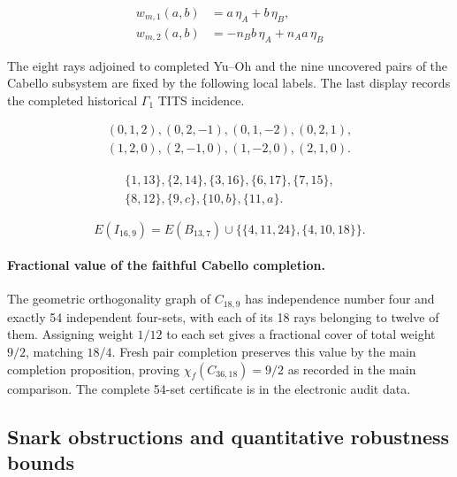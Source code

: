 \documentclass[aps,pra,reprint,superscriptaddress,longbibliography,nofootinbib,floatfix,10pt]{revtex4-2}
\theoremstyle{definition}
\begin{document}
\begin{equation}\label{d:eq:plane-param}
\begin{aligned}
w_{m,1}(a,b)&=a\,\eta_A+b\,\eta_B,\\
w_{m,2}(a,b)&=-n_B b\,\eta_A+n_A a\,\eta_B
\end{aligned}
\end{equation}

The eight rays adjoined to completed Yu--Oh and the nine uncovered pairs of the Cabello subsystem are fixed by the following local labels. The last display records the completed historical $\Gamma_1$ TITS incidence.

\begin{equation}\label{eq:yo-parent-eight}
\begin{gathered}
(0,1,2),(0,2,-1),(0,1,-2),(0,2,1),\\
(1,2,0),(2,-1,0),(1,-2,0),(2,1,0).
\end{gathered}
\end{equation}

\begin{equation}\label{eq:cabello-nine-pairs}
\begin{gathered}
\{1,13\},\{2,14\},\{3,16\},\{6,17\},\{7,15\},\\
\{8,12\},\{9,c\},\{10,b\},\{11,a\}.
\end{gathered}
\end{equation}

\begin{equation}\label{eq:i16}
 E(I_{16,9})=E(B_{13,7})\cup\{\{4,11,24\},\{4,10,18\}\}.
\end{equation}

\paragraph{Fractional value of the faithful Cabello completion.}
The geometric orthogonality graph of $C_{18,9}$ has independence number four and exactly 54 independent four-sets, with each of its 18 rays belonging to twelve of them. Assigning weight $1/12$ to each set gives a fractional cover of total weight $9/2$, matching $18/4$. Fresh pair completion preserves this value by the main completion proposition, proving $\chi_f(C_{36,18})=9/2$ as recorded in the main comparison. The complete 54-set certificate is in the electronic audit data.

\subsection{Snark obstructions and quantitative robustness bounds}\label{m:sec:directions}
\end{document}
